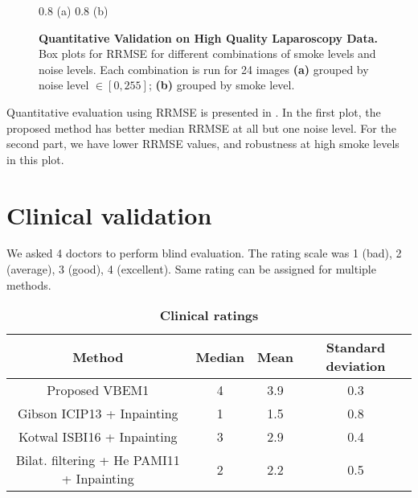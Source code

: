 \begin{figure}[!h]
     {0.8} {(a)}
     {0.8} {(b)}
    \caption{
        {\bf Quantitative Validation on High Quality Laparoscopy Data.}
        Box plots for RRMSE for different combinations of smoke levels and noise levels. Each combination is run for 24 images
        {\bf (a)} grouped by noise level $\in [0, 255]$;
        {\bf (b)} grouped by smoke level.
    }
    \label{fig:pgtBoxplots}
\end{figure}
Quantitative evaluation using RRMSE is presented in . In the first plot, the proposed method has better median RRMSE at all but one noise level. For the second part, we have lower RRMSE values, and robustness at high smoke levels in this plot.

\section{Clinical validation}
We asked 4 doctors to perform blind evaluation. The rating scale was 1 (bad), 2 (average), 3 (good), 4 (excellent). Same rating can be assigned for multiple methods.

\begin{table}[h!]
    \centering
    \vspace{20pt}
    \setlength{\tabcolsep}{12pt}
    \renewcommand{\arraystretch}{1.4}
    \begin{tabular}{| c | c | c | c |}
        \hline
        \textbf{Method} & \textbf{Median} & \textbf{Mean} & \textbf{Standard deviation} \\
        \hline
        Proposed VBEM1 & 4 & 3.9 & 0.3 \\
        \hline
        Gibson ICIP13 + Inpainting & 1 & 1.5 & 0.8 \\
        \hline
        Kotwal ISBI16 + Inpainting & 3 & 2.9 & 0.4 \\
        \hline
        Bilat. filtering + He PAMI11 + Inpainting & 2 & 2.2 & 0.5 \\
        \hline
    \end{tabular}
    \caption{\bf Clinical ratings}
    \label{table:clinalratings}
\end{table}

